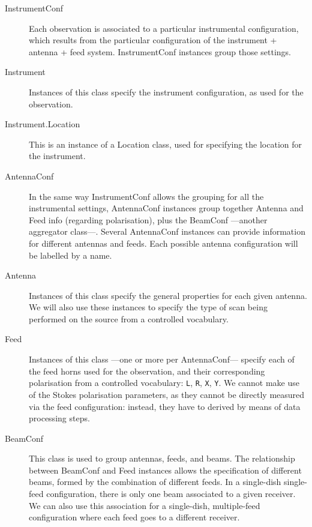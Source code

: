 		\begin{description}
			\item[InstrumentConf] Each observation is associated to
			a particular instrumental configuration, which results
			from the particular configuration of the instrument +
			antenna + feed system. InstrumentConf instances group
			those settings.
			
			 \item[Instrument] Instances of this class specify the
			instrument configuration, as used for the observation.
			
			 \item[Instrument.Location] This is an instance of a
			Location class, used for specifying the location for
			the instrument.
			
			 \item[AntennaConf] In the same way InstrumentConf
			allows the grouping for all the instrumental settings,
			AntennaConf instances group together Antenna and Feed
			info (regarding polarisation), plus the BeamConf ---another
			aggregator class---. Several AntennaConf instances
			can provide information for different antennas and
			feeds. Each possible antenna configuration will be
			labelled by a name.
			
			 \item[Antenna] Instances of this class specify the
			general properties for each given antenna. We will also
			use these instances to specify the type of scan being
			performed on the source from a controlled vocabulary.
			
			 \item[Feed] Instances of this class ---one or more per
			AntennaConf--- specify each of the feed horns used for
			the observation, and their corresponding polarisation
			from a controlled vocabulary: \texttt{L}, \texttt{R},
			\texttt{X}, \texttt{Y}. We cannot make use of the
			Stokes polarisation parameters, as they cannot be
			directly measured via the feed configuration: instead,
			they have to derived by means of data processing steps.
			
			 \item[BeamConf] This class is used to group antennas,
			feeds, and beams. The relationship between BeamConf and
			Feed instances allows the specification of different
			beams, formed by the combination of different feeds. In
			a single-dish single-feed configuration, there is only
			one beam associated to a given receiver. We can also
			use this association for a single-dish, multiple-feed
			configuration where each feed goes to a different
			receiver.
			

\end{description}
